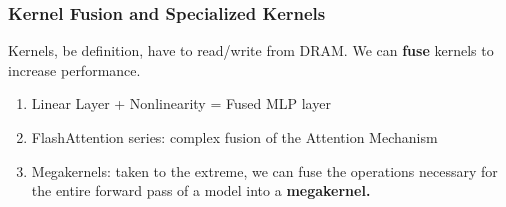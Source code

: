 \documentclass[main.tex]{subfiles}
\begin{document}
\begin{frame}
  \frametitle{Kernel Fusion and Specialized Kernels}
  Kernels, be definition, have to read/write from DRAM. We can \textbf{fuse}
  kernels to increase performance.
  \begin{enumerate}
    \item {
        Linear Layer + Nonlinearity = Fused MLP layer
      }
    \item {
        FlashAttention series: complex fusion of the Attention Mechanism
      }
    \item {
        Megakernels: taken to the extreme, we can fuse the operations necessary
        for the entire forward pass of a model into a \textbf{megakernel.}
      }
  \end{enumerate}
\end{frame}
\end{document}
